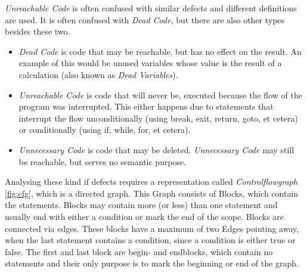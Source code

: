 \emph{Unreachable Code} is often confused with similar defects and different definitions are used.
It is often confused with \emph{Dead Code}, but there are also other types besides these two.
\begin{itemize}
  \item \emph{Dead Code} is code that may be reachable, but has no effect on the result. An example of this would be unused variables whose value is the result of a calculation (also known as \emph{Dead Variables}).
  \item \emph{Unreachable Code} is code that will never be, executed because the flow of the program was interrupted.
        This either happens due to statements that interrupt the flow unconditionally (using break, exit, return, goto, et cetera) or conditionally (using if, while, for, et cetera).
  \item \emph{Unnecessary Code} is code that may be deleted. \emph{Unnecessary Code} may still be reachable, but serves no semantic purpose.
\end{itemize}

Analysing these kind if defects requires a representation called \emph{Controlflowgraph} \ref{fig:cfg}, which is a directed graph.
This Graph consists of Blocks, which contain the statements.
Blocks may contain more (or less) than one statement and usually end with either a condition or mark the end of the scope.
Blocks are connected via edges.
These blocks have a maximum of two Edges pointing away, when the last statement contains a condition, since a condition is either true or false.
The first and last block are begin- and endblocks, which contain no statements and their only purpose is to mark the beginning or end of the graph.

